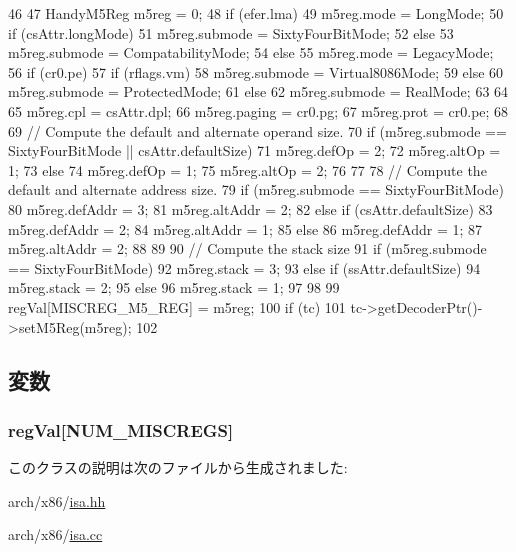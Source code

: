 \begin{DoxyCode}
46 {
47     HandyM5Reg m5reg = 0;
48     if (efer.lma) {
49         m5reg.mode = LongMode;
50         if (csAttr.longMode)
51             m5reg.submode = SixtyFourBitMode;
52         else
53             m5reg.submode = CompatabilityMode;
54     } else {
55         m5reg.mode = LegacyMode;
56         if (cr0.pe) {
57             if (rflags.vm)
58                 m5reg.submode = Virtual8086Mode;
59             else
60                 m5reg.submode = ProtectedMode;
61         } else {
62             m5reg.submode = RealMode;
63         }
64     }
65     m5reg.cpl = csAttr.dpl;
66     m5reg.paging = cr0.pg;
67     m5reg.prot = cr0.pe;
68 
69     // Compute the default and alternate operand size.
70     if (m5reg.submode == SixtyFourBitMode || csAttr.defaultSize) {
71         m5reg.defOp = 2;
72         m5reg.altOp = 1;
73     } else {
74         m5reg.defOp = 1;
75         m5reg.altOp = 2;
76     }
77 
78     // Compute the default and alternate address size.
79     if (m5reg.submode == SixtyFourBitMode) {
80         m5reg.defAddr = 3;
81         m5reg.altAddr = 2;
82     } else if (csAttr.defaultSize) {
83         m5reg.defAddr = 2;
84         m5reg.altAddr = 1;
85     } else {
86         m5reg.defAddr = 1;
87         m5reg.altAddr = 2;
88     }
89 
90     // Compute the stack size
91     if (m5reg.submode == SixtyFourBitMode) {
92         m5reg.stack = 3;
93     } else if (ssAttr.defaultSize) {
94         m5reg.stack = 2;
95     } else {
96         m5reg.stack = 1;
97     }
98 
99     regVal[MISCREG_M5_REG] = m5reg;
100     if (tc)
101         tc->getDecoderPtr()->setM5Reg(m5reg);
102 }
\end{DoxyCode}


\subsection{変数}
\hypertarget{classX86ISA_1_1ISA_a33fdce9a7f1c2a99683c4ef6fda1e32a}{
\subsubsection[{regVal}]{ {\bf regVal}\mbox{[}NUM\_\-MISCREGS\mbox{]}}}
\label{classX86ISA_1_1ISA_a33fdce9a7f1c2a99683c4ef6fda1e32a}


このクラスの説明は次のファイルから生成されました:\begin{DoxyCompactItemize}
\item 
arch/x86/\hyperlink{x86_2isa_8hh}{isa.hh}\item 
arch/x86/\hyperlink{x86_2isa_8cc}{isa.cc}\end{DoxyCompactItemize}
